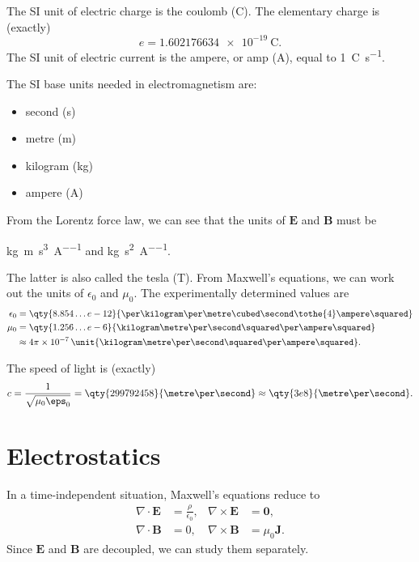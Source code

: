 \documentclass[12pt]{article}
\begin{document}
The SI unit of electric charge is the coulomb (\unit{\coulomb}). The elementary charge is (exactly)
\[
	e = \qty{1.602176634e-19}{\coulomb}
.\]
The SI unit of electric current is the ampere, or amp (\unit{\ampere}), equal to \qty{1}{\coulomb\per\second}.

The SI base units needed in electromagnetism are:
\begin{itemize}
	\item[] second (\unit{\second})
	\item[] metre (\unit{\metre})
	\item[] kilogram (\unit{\kilogram})
	\item[] ampere (\unit{\ampere})
\end{itemize}

From the Lorentz force law, we can see that the units of $\mathbf{E}$ and $\mathbf{B}$ must be
\begin{center}
	\unit{\kilogram\metre\per\second\cubed\per\ampere} and \unit{\kilogram\per\second\squared\per\ampere}.
\end{center}
The latter is also called the tesla (\unit{\tesla}). From Maxwell's equations, we can work out the units of $\epsilon_0$ and $\mu_0$. The experimentally determined values are
\begin{align*}
	\epsilon_0 &= \qty{8.854\dots e-12}{\per\kilogram\per\metre\cubed\second\tothe{4}\ampere\squared} \\
	\mu_0 &= \qty{1.256\dots e-6}{\kilogram\metre\per\second\squared\per\ampere\squared}\\
	      &\approx 4 \pi \times 10^{-7}\, \unit{\kilogram\metre\per\second\squared\per\ampere\squared}.
\end{align*}

The speed of light is (exactly)
\[
	c = \frac{1}{\sqrt{\mu_0 \eps_0}} = \qty{299792458}{\metre\per\second} \approx \qty{3e8}{\metre\per\second}
.\]

\newpage

\section{Electrostatics}
\label{sec:electrostatics}

In a time-independent situation, Maxwell's equations reduce to
\begin{align*}
	\nabla \cdot \mathbf{E} &= \frac{\rho}{\epsilon_0}, & \nabla \times \mathbf{E} &= \mathbf{0}, \\
	\nabla \cdot \mathbf{B} &= 0, & \nabla \times \mathbf{B} &= \mu_0 \mathbf{J}.
\end{align*}
Since $\mathbf{E}$ and $\mathbf{B}$ are decoupled, we can study them separately.
\end{document}
